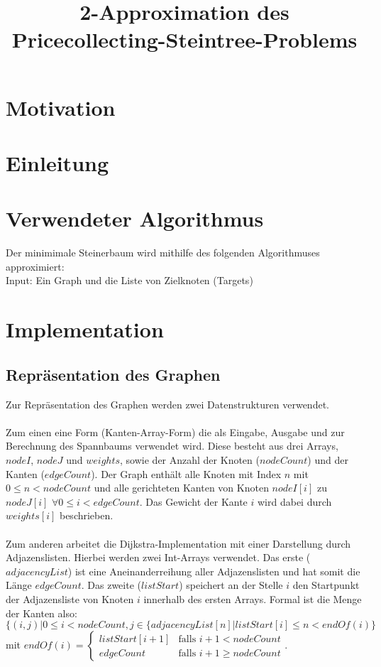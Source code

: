 \documentclass[a4paper,10pt]{article}
\title{2-Approximation des Pricecollecting-Steintree-Problems}
\author{}
\begin{document}
\maketitle

\begin{abstract}

\end{abstract}

\section{Motivation}

\section{Einleitung}

\section{Verwendeter Algorithmus}
Der minimimale Steinerbaum wird mithilfe des folgenden Algorithmuses approximiert:\\
Input: Ein Graph und die Liste von Zielknoten (Targets)\\

\section{Implementation}
\subsection{Repräsentation des Graphen}
Zur Repräsentation des Graphen werden zwei Datenstrukturen verwendet.\\
\\
Zum einen eine Form (Kanten-Array-Form) die als Eingabe, Ausgabe und zur Berechnung des Spannbaums verwendet wird. Diese besteht aus drei Arrays, $nodeI$, $nodeJ$ und $weights$, sowie der Anzahl der Knoten ($nodeCount$) und der Kanten ($edgeCount$). Der Graph enthält alle Knoten mit Index $n$ mit $ 0 \le n < nodeCount$ und alle gerichteten Kanten von Knoten $nodeI[i]$ zu $nodeJ[i]$ $\forall 0 \le i < edgeCount$. Das Gewicht der Kante $i$ wird dabei durch $weights[i]$ beschrieben.\\
\\
Zum anderen arbeitet die Dijkstra-Implementation mit einer Darstellung durch Adjazenslisten. Hierbei werden zwei Int-Arrays verwendet. Das erste ($adjacencyList$) ist eine Aneinanderreihung aller Adjazenslisten und hat somit die Länge $edgeCount$. Das zweite ($listStart$) speichert an der Stelle $i$ den Startpunkt der Adjazensliste von Knoten $i$ innerhalb des ersten Arrays. Formal ist die Menge der Kanten also:\\
$\{ (i,j) | 0 \le i < nodeCount, 
j \in \{adjacencyList[n]|listStart[i] \le n < endOf(i)\}$\\ mit $endOf(i) = 
\left\{
	\begin{array}{ll}
		listStart[i+1]  & \mbox{falls } i+1 < nodeCount \\
		edgeCount & \mbox{falls } i+1 \ge nodeCount
	\end{array}
\right.$.
\end{document}
